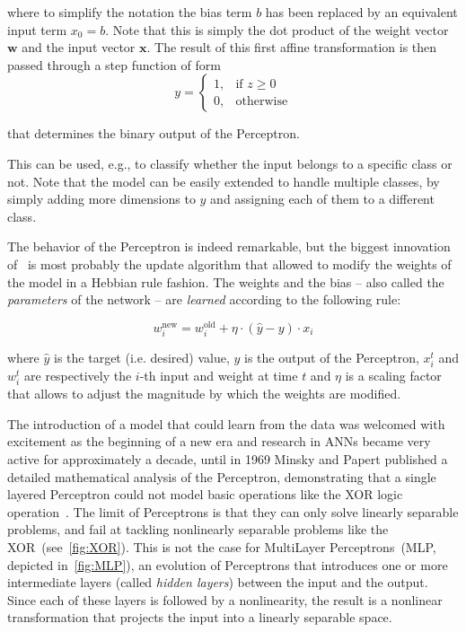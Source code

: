 \noindent where to simplify the notation the bias term $b$ has been replaced
by an equivalent input term $x_0=b$. Note that this is simply the dot
product of the weight vector $\mathbf{w}$ and the input vector $\mathbf{x}$.
The result of this first affine transformation is then passed through a step
function of form
\begin{equation*}
    y =
        \begin{cases}
            1,          & \text{if } z \geq 0 \\
            0,         & \text{otherwise}
        \end{cases}
\end{equation*}

\noindent that determines the binary output of the Perceptron.

This can be used, e.g., to classify whether the input belongs to a specific
class or not. Note that the model can be easily extended to handle multiple
classes, by simply adding more dimensions to $y$ and assigning each of them to
a different class.

The behavior of the Perceptron is indeed remarkable, but the biggest innovation
of~\cite{Rosenblatt57} is most probably the update algorithm that allowed to
modify the weights of the model in a Hebbian rule fashion. The weights and the
bias -- also called the \emph{parameters} of the network -- are \emph{learned}
according to the following rule:

\begin{equation}\label{eq:perceptron_lr}
    w_i^{\text{new}} = w_i^{\text{old}} + \eta \cdot (\hat {y} - y) \cdot x_i
\end{equation}

\noindent where $\hat y$ is the target (i.e. desired) value, $y$ is the output
of the Perceptron, $x_i^t$ and $w_i^t$ are respectively the $i$-th input and
weight at time $t$ and $\eta$ is a scaling factor that allows to adjust the
magnitude by which the weights are modified.

The introduction of a model that could learn from the data
was welcomed with excitement as the beginning of a new era and
research in ANNs became very active for approximately a decade, until in
1969 Minsky and Papert published a detailed mathematical analysis of the
Perceptron, demonstrating that a single layered Perceptron could not model
basic operations like the XOR logic operation~\citep{Minsky69}. The limit of
Perceptrons is that they can only solve linearly separable problems, and fail
at tackling nonlinearly separable problems like the
XOR~(see~\autoref{fig:XOR}). This is not the case for MultiLayer
Perceptrons~(MLP, depicted in~\autoref{fig:MLP}), an evolution of Perceptrons
that introduces one or more intermediate layers (called \emph{hidden layers})
between the input and the output. Since each of these layers is followed by a
nonlinearity, the result is a nonlinear transformation that projects the input
into a linearly separable space.


